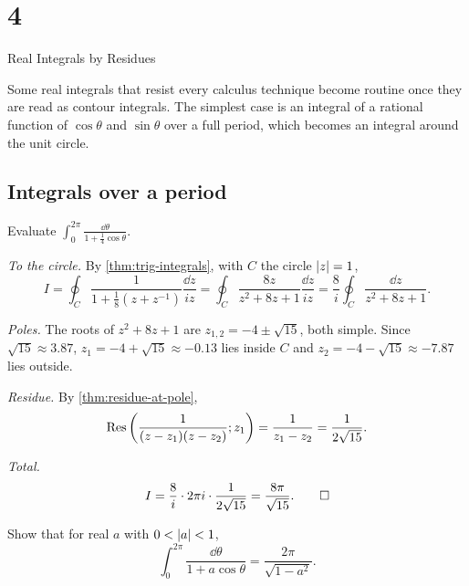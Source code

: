\chapter{4}{Real Integrals by Residues}

Some real integrals that resist every calculus technique become routine
once they are read as contour integrals. The simplest case is an integral of
a rational function of $\cos\theta$ and $\sin\theta$ over a full period, which
becomes an integral around the unit circle.

\section{Integrals over a period}\label{sec:trig-integrals}



\begin{exercise}\label{ex:one-plus-quarter-cos}
  Evaluate $\displaystyle \int_0^{2\pi} \frac{\dd\theta}{1 + \frac14 \cos\theta}$.
\end{exercise}

\begin{solution}
  \emph{To the circle.} By \cref{thm:trig-integrals}, with $C$ the circle
  $\lvert z\rvert = 1$,
  \[
    I = \oint_C \frac{1}{1 + \frac18\left(z + z^{-1}\right)} \frac{\dd z}{iz}
      = \oint_C \frac{8z}{z^2 + 8z + 1} \frac{\dd z}{iz}
      = \frac{8}{i} \oint_C \frac{\dd z}{z^2 + 8z + 1}.
  \]

  \emph{Poles.} The roots of $z^2 + 8z + 1$ are
  $z_{1,2} = -4 \pm \sqrt{15}$, both simple. Since $\sqrt{15} \approx 3.87$,
  $z_1 = -4 + \sqrt{15} \approx -0.13$ lies inside $C$ and
  $z_2 = -4 - \sqrt{15} \approx -7.87$ lies outside.

  \emph{Residue.} By \cref{thm:residue-at-pole},
  \[
    \operatorname{Res}\left( \frac{1}{(z - z_1)(z - z_2)}; z_1 \right)
    = \frac{1}{z_1 - z_2} = \frac{1}{2\sqrt{15}}.
  \]

  \emph{Total.}
  \[
    I = \frac{8}{i} \cdot 2\pi i \cdot \frac{1}{2\sqrt{15}}
      = \frac{8\pi}{\sqrt{15}}. \qedhere
  \]
\end{solution}

\begin{exercise}\label{ex:one-plus-a-cos}
  Show that for real $a$ with $0 < \lvert a\rvert < 1$,
  \[
    \int_0^{2\pi} \frac{\dd\theta}{1 + a\cos\theta} = \frac{2\pi}{\sqrt{1 - a^2}}.
  \]
\end{exercise}

